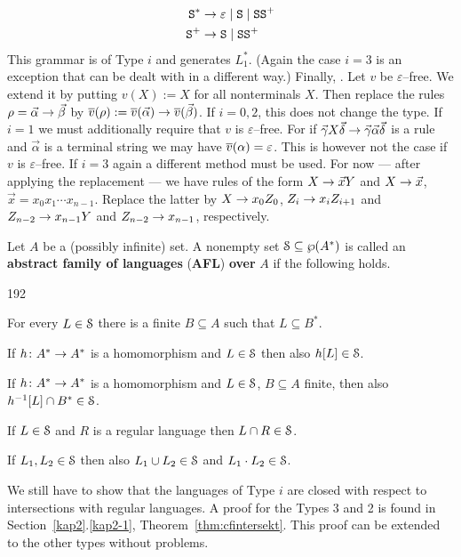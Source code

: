 \begin{equation}
\begin{split}
\mbox{\tt S}^{\ast} & \rightarrow \varepsilon \mid  \mbox{\tt S}
    \mid  \mbox{\tt S}\mbox{\tt S}^+ \\
\mbox{\tt S}^+      & \rightarrow \mbox{\tt S} \mid \mbox{\tt SS}^+
\end{split}
\end{equation}
This grammar is of Type $i$ and generates $L_1^{\ast}$.
(Again the case $i = 3$ is an exception that can be dealt with
in a  different way.) Finally, . Let $v$ be 
$\varepsilon$--free. We extend it by putting $v(X) := X$ for all 
nonterminals $X$. Then replace the rules $\rho = \vec{\alpha} \rightarrow \vec{\beta}$
by $\overline{v}(\rho) := \overline{v}(\vec{\alpha}) \rightarrow \overline{v}(\vec{\beta})$.
If $i = 0, 2$, this does not change the type. If $i = 1$ we must
additionally require that $v$ is $\varepsilon$--free.
For if $\vec{\gamma} X \vec{\delta} \rightarrow
\vec{\gamma} \vec{\alpha} \vec{\delta}$ is a rule
and $\vec{\alpha}$ is a terminal string we may have
$\overline{v}(\alpha) = \varepsilon$. This is however not the case
if $v$ is $\varepsilon$--free. If $i = 3$ again a different
method must be used.  For now --- after applying the replacement
--- we have rules of the form $X \rightarrow \vec{x} Y$ and $X \rightarrow \vec{x}$,
$\vec{x} = x_0 x_1 \dotsb x_{n-1}$. Replace the latter by $X \rightarrow
x_0 Z_0$, $Z_i \rightarrow x_i Z_{i+1}$ and $Z_{n-2} \rightarrow x_{n-1} Y$ and
$Z_{n-2} \rightarrow x_{n-1}$, respectively. \proofend
\begin{defn}
Let $A$ be a (possibly infinite) set. A nonempty set $\mathcal{S} \subseteq 
\wp(A^{\ast})$ is called an \textbf{abstract family of languages} 
(\textbf{AFL}) \textbf{over} $A$ if the following holds.
\begin{dingautolist}{192}
\item For every $L \in \mathcal{S}$ there is a finite
    $B \subseteq A$ such that $L \subseteq B^{\ast}$.
\item If $h \colon A^{\ast} \rightarrow A^{\ast}$ is a homomorphism
    and $L \in \mathcal{S}$ then also $h[L] \in \mathcal{S}$.
\item If $h \colon A^{\ast} \rightarrow A^{\ast}$ is a homomorphism
    and $L \in \mathcal{S}$, $B \subseteq A$ finite, then also
    $h^{-1}[L] \cap B^{\ast} \in \mathcal{S}$.
\item If $L \in \mathcal{S}$ and $R$ is a  regular language then
    $L \cap R \in \mathcal{S}$.
\item If $L_1, L_2 \in \mathcal{S}$ then also $L_1 \cup L_2 \in \mathcal{S}$ and
    $L_1 \cdot L_2 \in \mathcal{S}$.
\end{dingautolist}
\end{defn}
We still have to show that the languages of Type $i$ are closed
with respect to intersections with regular languages. A proof for
the Types 3 and 2 is found in Section~\ref{kap2}.\ref{kap2-1},
Theorem~\ref{thm:cfintersekt}.
This proof can be extended to the other types without problems.

